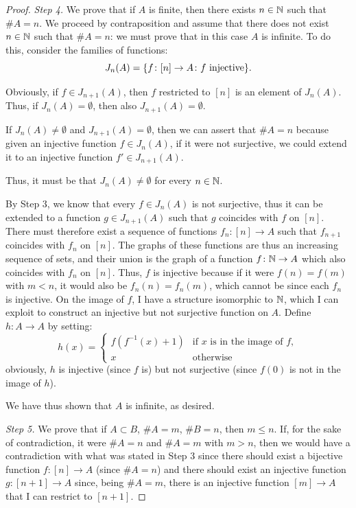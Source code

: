 \begin{proof}
\emph{Step 4.}
We prove that if $A$ is finite, then there exists $n\in {\mathbb N}$ such that $\#A=n$.
We proceed by contraposition and assume that there does not exist $n\in {\mathbb N}$
such that $\#A=n$:
we must prove that in this case $A$ is infinite.
To do this, consider the families of functions:
\[
  J_n(A) = {\left\{ f\colon [n]\to A\colon f \text{ injective} \right\}}.
\]

Obviously, if $f\in J_{n+1}(A)$, then $f$ restricted to $[n]$ is an element of
$J_n(A)$.
Thus, if $J_n(A)=\emptyset$, then also $J_{n+1}(A)=\emptyset$.
 
If $J_n(A)\neq \emptyset$ and $J_{n+1}(A)=\emptyset$, then we can assert that
$\#A=n$
because given an injective function $f\in J_n(A)$, if it were not surjective, we
could
extend it to an injective function $f'\in J_{n+1}(A)$.

Thus, it must be that $J_n(A)\neq \emptyset$ for every $n\in {\mathbb N}$.

By Step 3, we know that every 
$f\in J_n(A)$ is not surjective, thus it can be extended 
to a function $g\in J_{n+1}(A)$
such that $g$ coincides with $f$ on $[n]$. 
There must therefore exist a sequence of functions
$f_n\colon [n]\to A$ such that $f_{n+1}$ coincides with $f_n$ on $[n]$.
The graphs of these functions are thus an increasing sequence of sets, and their
union is the graph of a function $f\colon {\mathbb N} \to A$ which also 
coincides with $f_n$ on $[n]$. 
Thus, $f$ is injective because if it were $f(n)=f(m)$
with $m<n$, it would also be $f_n(n)=f_n(m)$, which cannot be since each $f_n$
is injective.
On the image of $f$, I have a structure isomorphic to ${\mathbb N}$, which I can exploit
to
construct an injective but not surjective function on $A$.
Define $h\colon A\to A$ by setting:
\[
  h(x) = \begin{cases}
    f(f^{-1}(x)+1) &\text{if $x$ is in the image of $f$},\\
    x &\text{otherwise}
  \end{cases}
\]
obviously, $h$ is injective (since $f$ is) 
but not surjective (since $f(0)$ is not in the image of $h$).

We have thus shown that $A$ is infinite, as desired.

\emph{Step 5.}
We prove that if $A\subset B$, $\#A=m$, $\#B=n$, then $m\le n$.
If, for the sake of contradiction, it were $\#A=n$ and $\#A=m$ with $m>n$, then 
we would have a contradiction with what was stated in Step 3
since there should exist a bijective function $f\colon[n]\to A$ 
(since $\#A=n$) and there should exist an injective function 
$g\colon[n+1]\to A$ since, being $\#A=m$, there is an injective function 
$[m]\to A$ that I can restrict to $[n+1]$.
\end{proof}

